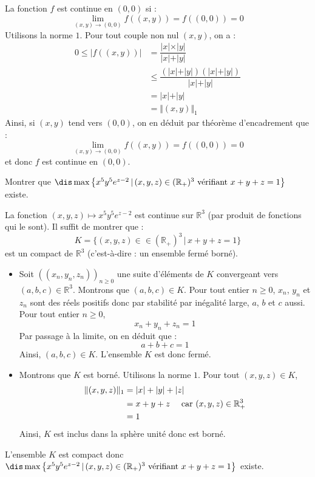 \documentclass[a4paper,10pt]{report}
\begin{document}
\corr La fonction $f$ est continue en $(0,0)$ si :
$$ \lim_{(x,y) \rightarrow (0,0)} f((x,y)) =f((0,0))= 0$$
Utilisons la norme $1$. Pour tout couple non nul $(x,y)$, on a :
\begin{align*}
0 \leq \vert f((x,y)) \vert & = \dfrac{\vert x \vert \times \vert y \vert}{\vert x \vert + \vert y \vert} \\
& \leq \dfrac{(\vert x \vert + \vert y \vert)(\vert x \vert + \vert y \vert)}{\vert x \vert + \vert y \vert} \\
& = \vert x \vert + \vert y \vert \\
& = \Vert (x,y) \Vert_1
\end{align*}
Ainsi, si $(x,y)$ tend vers $(0,0)$, on en déduit par théorème d'encadrement que :
$$  \lim_{(x,y) \rightarrow (0,0)} f((x,y)) =f((0,0))= 0$$
et donc $f$ est continue en $(0,0)$.




\begin{Exa} Montrer que $\dis \max \left\lbrace x^5y^5 e^{z-2} \, \vert \, (x,y,z) \in (\mathbb{R}_+)^3 \hbox{ vérifiant } x+y+z =1 \right\rbrace$ existe.
\end{Exa}

\corr La fonction $(x,y,z) \mapsto x^5y^5 e^{z-2}$ est continue sur $\mathbb{R}^3$ (par produit de fonctions qui le sont). Il suffit de montrer que :
$$K= \lbrace (x,y,z) \in \in (\mathbb{R}_+)^3 \, \vert \, x+y+z=1 \rbrace$$
est un compact de $\mathbb{R}^3$ (c'est-à-dire : un ensemble fermé borné).

\begin{itemize}
\item Soit $((x_n,y_n,z_n))_{n \geq 0}$ une suite d'éléments de $K$ convergeant vers $(a,b,c) \in \mathbb{R}^3$. Montrons que $(a,b,c) \in K$. Pour tout entier $n \geq 0$, $x_n$, $y_n$ et $z_n$ sont des réels positifs donc par stabilité par inégalité large, $a$, $b$ et $c$ aussi. Pour tout entier $n \geq 0$,
$$ x_n + y_n + z_n = 1$$
Par passage à la limite, on en déduit que :
$$ a+b+c=1$$
Ainsi, $(a,b,c) \in K$. L'ensemble $K$ est donc fermé.
\item Montrons que $K$ est borné. Utilisons la norme $1$. Pour tout $(x,y,z) \in K$,
\begin{align*}
\Vert (x,y,z) \Vert_1 & = \vert x \vert + \vert y \vert + \vert z \vert \\
& = x+y+z \quad \hbox{ car } (x,y,z) \in \mathbb{R}_+^{3} \\
& = 1
\end{align*}
Ainsi, $K$ est inclus dans la sphère unité donc est borné.
\end{itemize}
L'ensemble $K$ est compact donc $\dis \max \left\lbrace x^5y^5 e^{z-2} \, \vert \, (x,y,z) \in (\mathbb{R}_+)^3 \hbox{ vérifiant } x+y+z =1 \right\rbrace$ existe.
\end{document}
